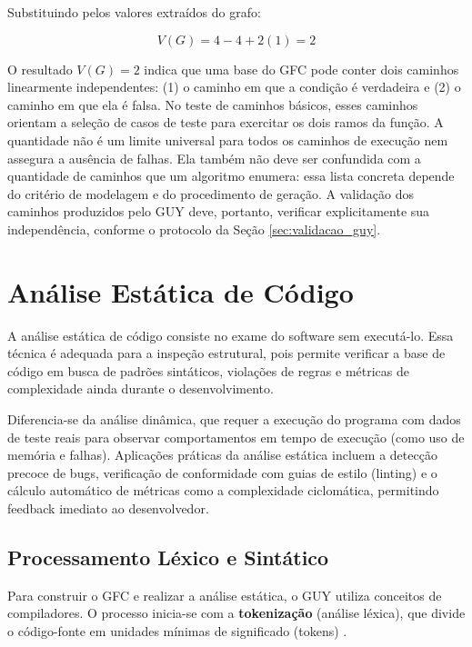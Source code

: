 Substituindo pelos valores extraídos do grafo:

\[
    V(G) = 4 - 4 + 2(1) = 2
\]

O resultado $V(G) = 2$ indica que uma base do GFC pode conter dois caminhos linearmente independentes: (1) o caminho em que a condição é verdadeira e (2) o caminho em que ela é falsa. No teste de caminhos básicos, esses caminhos orientam a seleção de casos de teste para exercitar os dois ramos da função. A quantidade não é um limite universal para todos os caminhos de execução nem assegura a ausência de falhas. Ela também não deve ser confundida com a quantidade de caminhos que um algoritmo enumera: essa lista concreta depende do critério de modelagem e do procedimento de geração. A validação dos caminhos produzidos pelo GUY deve, portanto, verificar explicitamente sua independência, conforme o protocolo da Seção \ref{sec:validacao_guy}.



\section{Análise Estática de Código}

A análise estática de código consiste no exame do software sem executá-lo. Essa técnica é adequada para a inspeção estrutural, pois permite verificar a base de código em busca de padrões sintáticos, violações de regras e métricas de complexidade ainda durante o desenvolvimento.

Diferencia-se da análise dinâmica, que requer a execução do programa com dados de teste reais para observar comportamentos em tempo de execução (como uso de memória e falhas). Aplicações práticas da análise estática incluem a detecção precoce de bugs, verificação de conformidade com guias de estilo (linting) e o cálculo automático de métricas como a complexidade ciclomática, permitindo feedback imediato ao desenvolvedor.

\subsection{Processamento Léxico e Sintático}

Para construir o GFC e realizar a análise estática, o GUY utiliza conceitos de compiladores. O processo inicia-se com a \textbf{tokenização} (análise léxica), que divide o código-fonte em unidades mínimas de significado (tokens) .

